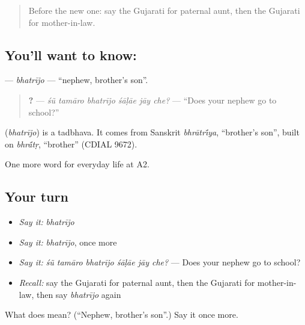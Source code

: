 \label{lesson:GU-C263-bhatrijo}



\begin{quote}
Before the new one: say the Gujarati for paternal aunt, then the Gujarati for mother-in-law.
\end{quote}

\subsection*{You'll want to know: }
\textbf{} — \emph{bhatrījo} — \textquotedblleft{}nephew, brother's son\textquotedblright{}.

\begin{quote}
\textbf{     ?} — \emph{śũ tamāro bhatrījo śāḷāe jāy che?} — \textquotedblleft{}Does your nephew go to school?\textquotedblright{}
\end{quote}

\begin{cousinweb}
\textbf{} (\emph{bhatrījo}) is a tadbhava. It comes from Sanskrit \emph{bhrātr\'{\={\i}}ya}, \textquotedblleft{}brother's son\textquotedblright{}, built on \emph{bhr\'{\={a}}tṛ}, \textquotedblleft{}brother\textquotedblright{} (CDIAL 9672).
\end{cousinweb}

\begin{grammarlens}[title={What you've built}]
One more word for everyday life at A2.
\end{grammarlens}

\subsection*{Your turn}
\begin{itemize}
\raggedright
  \item \emph{Say it:} \emph{bhatrījo}
  \item \emph{Say it:} \emph{bhatrījo}, once more
  \item \emph{Say it:} \emph{śũ tamāro bhatrījo śāḷāe jāy che?} — Does your nephew go to school?
  \item \emph{Recall:} say the Gujarati for paternal aunt, then the Gujarati for mother-in-law, then say \emph{bhatrījo} again
\end{itemize}

\begin{tcolorbox}[breakable,colback=teal!4,colframe=teal!35!black,title={Before you move on}]
What does  mean? (\textquotedblleft{}Nephew, brother's son\textquotedblright{}.) Say it once more.
\end{tcolorbox}
